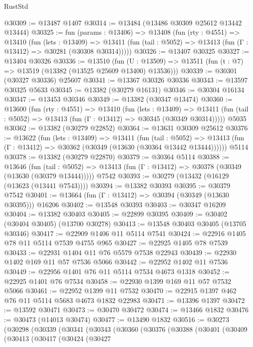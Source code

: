 \begin{lexlean}{RustStd}
\begin{coremodule}
@30309 := @13487 @1407
@30314 := @13484 (@13486 @30309 @25612 @13442 @13444)
@30325 := fun (params : @13406) =>
  @13408
    (fun (rty : @4551) =>
    @13410
      (fun (lets : @13409) =>
      @13411 (fun (tail : @5052) => @13413 (fun (Γ : @13412) => @30281 (@30308 @30314)))))
@30326 := @13407 @30325
@30327 := @13404 @30326
@30336 := @13510
    (fun (U : @13509) => @13511 (fun (t : @7) => @13519 (@13382 (@13525 @25609 @13400) @13536)))
@30339 := @30301 (@30327 @30336) @25607
@30341 := @13367 @30326 @30336
@30343 := @13597 @30325 @5633
@30345 := @13382 (@30279 @16131)
@30346 := @30304 @16134
@30347 := @13453 @30346
@30349 := @13382 (@30347 @13474)
@30360 := @13600
    (fun (rty : @4551) =>
    @13410
      (fun (lets : @13409) =>
      @13411 (fun (tail : @5052) => @13413 (fun (Γ : @13412) => @30345 (@30349 @30314)))))
    @5035
@30362 := @13382 (@30279 @22852)
@30364 := @13631 @30309 @25612
@30376 := @13622
    (fun (lets : @13409) =>
    @13411
      (fun (tail : @5052) =>
      @13413 (fun (Γ : @13412) => @30362 (@30349 (@13630 (@30364 @13442 @13444))))))
    @5114
@30378 := @13382 (@30279 @22870)
@30379 := @30364 @5114
@30388 := @13646
    (fun (tail : @5052) => @13413 (fun (Γ : @13412) => @30378 (@30349 (@13630 (@30379 @13444)))))
    @7542
@30393 := @30279 (@13432 (@16129 (@13623 (@13441 @7543))))
@30394 := @13382 @30393
@30395 := @30379 @7542
@30401 := @13664 (fun (Γ : @13412) => @30394 (@30349 (@13630 @30395))) @16206
@30402 := @13548 @30393
@30403 := @30347 @16209
@30404 := @13382 @30403
@30405 := @22899 @30395
@30409 := @30402 (@30404 @30405) (@13700 @30278)
@30413 := @13548 @30403 @30405 (@13705 @30346)
@30417 := @22909 @1406 @11 @5114 @7541
@30424 := @22916 @1405 @78 @11 @5114 @7539 @4755 @965
@30427 := @22925 @1405 @78 @7539
@30433 := @22931 @1404 @11 @76 @5579 @7538 @22943
@30439 := @22930 @1402 @169 @11 @57 @7536 @5066
@30442 := @22952 @1402 @11 @7536
@30449 := @22956 @1401 @76 @11 @5114 @7534 @4673 @1318
@30452 := @22925 @1401 @76 @7534
@30458 := @22930 @1399 @169 @11 @57 @7532 @5066
@30461 := @22952 @1399 @11 @7532
@30470 := @22915 @1397 @462 @76 @11 @5114 @5683 @4673 @1832 @22983
@30471 := @13396 @1397
@30472 := @13592 @30471
@30473 := @30470 @30472
@30474 := @13466 @1832
@30476 := @30473 (@14013 @30474)
@30477 := @13490 @1832
@30516 := @30273
    (@30298
      (@30339
        (@30341
          (@30343
            (@30360
              (@30376
                (@30388
                  (@30401
                    (@30409
                      (@30413
                        (@30417
                          (@30424
                            (@30427

\end{coremodule}
\end{lexlean}
